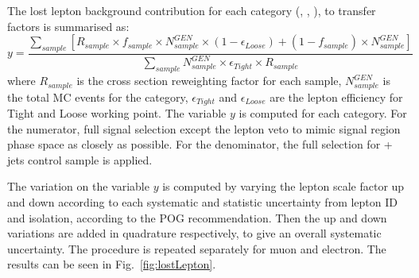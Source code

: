 The lost lepton background contribution for each category (\njet, \nb, \scalht), to 
transfer factors is summarised as:
\begin{equation}
    \label{eq:lostLepTF}
    y = \frac{\sum_{sample} [ R_{sample} \times f_{sample} \times N^{GEN}_{sample} \times ( 1 - \epsilon_{Loose} ) + ( 1 - f_{sample} ) \times N^{GEN}_{sample} ]}{ \sum_{sample} N^{GEN}_{sample} \times \epsilon_{Tight} \times R_{sample} }
\end{equation}
where $R_{sample}$ is the cross section reweighting factor for each sample, 
$N^{GEN}_{sample}$ is the total MC events for the category, $\epsilon_{Tight}$
and $\epsilon_{Loose}$ are the lepton efficiency for Tight and Loose working 
point. The variable $y$ is computed for each category. For the numerator, full
signal selection except the lepton veto to mimic signal region phase space as
closely as possible. For the denominator, the full selection for \mj + jets 
control sample is applied.

The variation on the variable $y$ is computed by varying the lepton scale factor
up and down according to each systematic and statistic uncertainty from lepton
ID and isolation, according to the POG recommendation. Then the up and down 
variations are added in quadrature respectively, to give an overall systematic 
uncertainty. The procedure is repeated separately for muon and
electron. The results can be seen in Fig.~\ref{fig:lostLepton}.

